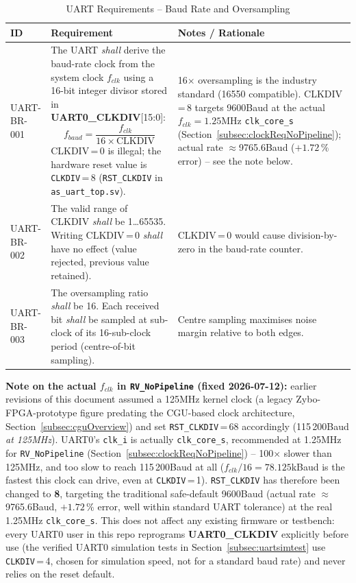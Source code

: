\begin{table}[H]
\caption{UART Requirements -- Baud Rate and Oversampling}
\label{tab:asUartReqBR}
\centering
\begin{tabularx}{\textwidth}{|l |X |X|}
  \hline
  ID & Requirement & Notes / Rationale \\
  \hline
  \hline
  UART-BR-001 &
    The UART \textit{shall} derive the baud-rate clock from the system clock
    $f_{clk}$ using a 16-bit integer divisor stored in
    \textbf{UART0\_CLKDIV}[15:0]:
    \[ f_{baud} = \frac{f_{clk}}{16 \times \text{CLKDIV}} \]
    CLKDIV\,=\,0 is illegal; the hardware reset value is
    \texttt{CLKDIV}\,=\,8 (\texttt{RST\_CLKDIV} in \texttt{as\_uart\_top.sv}). &
    16$\times$ oversampling is the industry standard (16550 compatible).
    CLKDIV\,=\,8 targets 9600\;Baud at the actual $f_{clk}=1.25$\;MHz
    \texttt{clk\_core\_s} (Section~\ref{subsec:clockReqNoPipeline}); actual
    rate $\approx$9765.6\;Baud ($+1.72\,\%$ error) -- see the note below. \\
  \hline
  UART-BR-002 &
    The valid range of CLKDIV \textit{shall} be 1\ldots65535.
    Writing CLKDIV\,=\,0 \textit{shall} have no effect (value rejected,
    previous value retained). &
    CLKDIV\,=\,0 would cause division-by-zero in the baud-rate counter. \\
  \hline
  UART-BR-003 &
    The oversampling ratio \textit{shall} be 16.
    Each received bit \textit{shall} be sampled at sub-clock\;8 of its
    16-sub-clock period (centre-of-bit sampling). &
    Centre sampling maximises noise margin relative to both edges. \\
  \hline
\end{tabularx}
\end{table}

\textbf{Note on the actual $f_{clk}$ in \texttt{RV\_NoPipeline}
(fixed 2026-07-12):} earlier revisions of this document assumed a
125\;MHz kernel clock (a legacy Zybo-FPGA-prototype figure predating the
CGU-based clock architecture, Section~\ref{subsec:cguOverview}) and set
\texttt{RST\_CLKDIV}\,=\,68 accordingly (115\,200\;Baud \emph{at 125\;MHz}).
UART0's \texttt{clk\_i} is actually \texttt{clk\_core\_s}, recommended at
1.25\;MHz for \texttt{RV\_NoPipeline}
(Section~\ref{subsec:clockReqNoPipeline}) -- 100$\times$ slower than
125\;MHz, and too slow to reach 115\,200\;Baud at all
($f_{clk}/16 = 78.125$\;kBaud is the fastest this clock can drive, even at
\texttt{CLKDIV}\,=\,1).
\texttt{RST\_CLKDIV} has therefore been changed to \textbf{8}, targeting
the traditional safe-default 9600\;Baud (actual rate $\approx$9765.6\;Baud,
$+1.72\,\%$ error, well within standard UART tolerance) at the real
1.25\;MHz \texttt{clk\_core\_s}.
This does not affect any existing firmware or testbench: every UART0 user
in this repo reprograms \textbf{UART0\_CLKDIV} explicitly before use (the
verified UART0 simulation tests in Section~\ref{subsec:uartsimtest} use
\texttt{CLKDIV}\,=\,4, chosen for simulation speed, not for a standard baud
rate) and never relies on the reset default.

